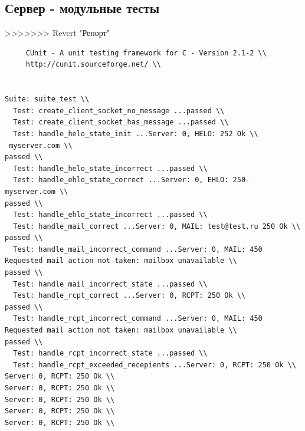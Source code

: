 \documentclass[a4paper,12pt]{report}
\begin{document}
\subsection*{Сервер - модульные тесты}
>>>>>>> Revert "Репорт"
\begin{verbatim}
     CUnit - A unit testing framework for C - Version 2.1-2 \\
     http://cunit.sourceforge.net/ \\


Suite: suite_test \\
  Test: create_client_socket_no_message ...passed \\
  Test: create_client_socket_has_message ...passed \\
  Test: handle_helo_state_init ...Server: 0, HELO: 252 Ok \\
 myserver.com \\
passed \\
  Test: handle_helo_state_incorrect ...passed \\
  Test: handle_ehlo_state_correct ...Server: 0, EHLO: 250- myserver.com \\
passed \\
  Test: handle_ehlo_state_incorrect ...passed \\
  Test: handle_mail_correct ...Server: 0, MAIL: test@test.ru 250 Ok \\
passed \\
  Test: handle_mail_incorrect_command ...Server: 0, MAIL: 450 Requested mail action not taken: mailbox unavailable \\
passed \\
  Test: handle_mail_incorrect_state ...passed \\
  Test: handle_rcpt_correct ...Server: 0, RCPT: 250 Ok \\
passed \\
  Test: handle_rcpt_incorrect_command ...Server: 0, MAIL: 450 Requested mail action not taken: mailbox unavailable \\
passed \\
  Test: handle_rcpt_incorrect_state ...passed \\
  Test: handle_rcpt_exceeded_recepients ...Server: 0, RCPT: 250 Ok \\
Server: 0, RCPT: 250 Ok \\
Server: 0, RCPT: 250 Ok \\
Server: 0, RCPT: 250 Ok \\
Server: 0, RCPT: 250 Ok \\
Server: 0, RCPT: 250 Ok \\

\end{verbatim}
\end{document}
